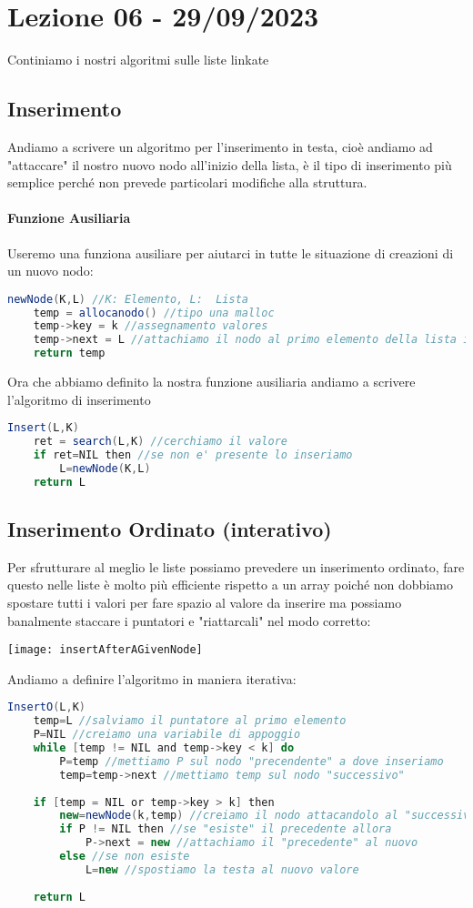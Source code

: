 \section{Lezione 06 - 29/09/2023}
Continiamo i nostri algoritmi sulle liste linkate
\subsection{Inserimento}
Andiamo a scrivere un algoritmo per l'inserimento in testa, cioè andiamo ad "attaccare" il nostro nuovo nodo all'inizio della lista, è il tipo di inserimento più semplice perché non prevede particolari modifiche alla struttura.
\paragraph{Funzione Ausiliaria} Useremo una funziona ausiliare per aiutarci in tutte le situazione di creazioni di un nuovo nodo:
\begin{lstlisting}[language=Java]
newNode(K,L) //K: Elemento, L:  Lista
	temp = allocanodo() //tipo una malloc
	temp->key = k //assegnamento valores
	temp->next = L //attachiamo il nodo al primo elemento della lista in input
	return temp
\end{lstlisting}
Ora che abbiamo definito la nostra funzione ausiliaria andiamo a scrivere l'algoritmo di inserimento
\begin{lstlisting}[language=Java]
Insert(L,K)
	ret = search(L,K) //cerchiamo il valore
	if ret=NIL then //se non e' presente lo inseriamo
		L=newNode(K,L)
	return L
\end{lstlisting}

\subsection{Inserimento Ordinato (interativo)}
Per sfrutturare al meglio le liste possiamo prevedere un inserimento ordinato, fare questo nelle liste è molto più efficiente rispetto a un array poiché non dobbiamo spostare tutti i valori per fare spazio al valore da inserire ma possiamo banalmente staccare i puntatori e "riattarcali" nel modo corretto:
\begin{center}
\texttt{[image: insertAfterAGivenNode]}
\end{center}
\newpage
Andiamo a definire l'algoritmo in maniera iterativa:
\begin{lstlisting}[language=Java]
InsertO(L,K)
	temp=L //salviamo il puntatore al primo elemento
	P=NIL //creiamo una variabile di appoggio
	while [temp != NIL and temp->key < k] do 
		P=temp //mettiamo P sul nodo "precendente" a dove inseriamo
		temp=temp->next //mettiamo temp sul nodo "successivo"
		
	if [temp = NIL or temp->key > k] then
		new=newNode(k,temp) //creiamo il nodo attacandolo al "successivo"
		if P != NIL then //se "esiste" il precedente allora
			P->next = new //attachiamo il "precedente" al nuovo
		else //se non esiste
			L=new //spostiamo la testa al nuovo valore 
			
	return L 	
\end{lstlisting}

